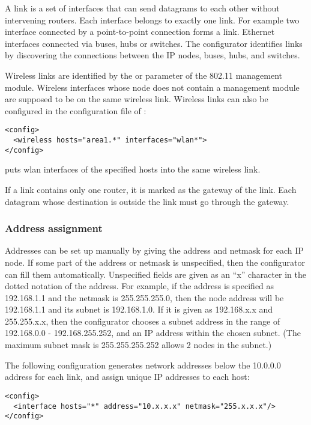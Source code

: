 A link is a set of interfaces that can send datagrams to each other
without intervening routers. Each interface belongs to exactly
one link. For example two interface connected
by a point-to-point connection forms a link. Ethernet interfaces
connected via buses, hubs or switches.
The configurator identifies links by discovering
the connections between the IP nodes, buses, hubs, and switches.

Wireless links are identified by the  or 
parameter of the 802.11 management module. Wireless interfaces
whose node does not contain a management module are supposed
to be on the same wireless link. Wireless links can also be
configured in the configuration file of :
\begin{verbatim}
<config>
  <wireless hosts="area1.*" interfaces="wlan*">
</config>
\end{verbatim}
puts wlan interfaces of the specified hosts into the same wireless link.

If a link contains only one router, it is marked as the gateway
of the link. Each datagram whose destination is outside the link
must go through the gateway.

\subsubsection*{Address assignment}

Addresses can be set up manually by giving the address and netmask for
each IP node. If some part of the address or netmask is unspecified,
then the configurator can fill them automatically. Unspecified fields
are given as an ``x'' character in the dotted notation of the address.
For example, if the address is specified as 192.168.1.1 and the
netmask is 255.255.255.0, then the node address will be 192.168.1.1
and its subnet is 192.168.1.0. If it is given as 192.168.x.x and
255.255.x.x, then the configurator chooses a subnet address in the range
of 192.168.0.0 - 192.168.255.252, and an IP address within the chosen
subnet. (The maximum subnet mask is 255.255.255.252 allows 2 nodes in the subnet.)

The following configuration generates network addresses below the 10.0.0.0
address for each link, and assign unique IP addresses to each host:

\begin{verbatim}
<config>
  <interface hosts="*" address="10.x.x.x" netmask="255.x.x.x"/>
</config>
\end{verbatim}

